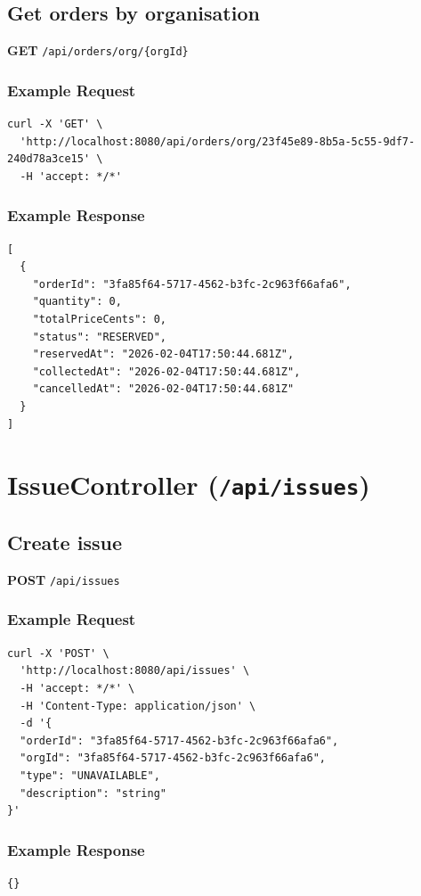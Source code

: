 \documentclass[a4paper,11pt]{article}
\begin{document}
\subsection{Get orders by organisation}
\textbf{GET} \texttt{/api/orders/org/\{orgId\}}
\subsubsection*{Example Request}
\begin{lstlisting}
curl -X 'GET' \
  'http://localhost:8080/api/orders/org/23f45e89-8b5a-5c55-9df7-240d78a3ce15' \
  -H 'accept: */*'
\end{lstlisting}

\subsubsection*{Example Response}
\begin{lstlisting}
[
  {
    "orderId": "3fa85f64-5717-4562-b3fc-2c963f66afa6",
    "quantity": 0,
    "totalPriceCents": 0,
    "status": "RESERVED",
    "reservedAt": "2026-02-04T17:50:44.681Z",
    "collectedAt": "2026-02-04T17:50:44.681Z",
    "cancelledAt": "2026-02-04T17:50:44.681Z"
  }
]
\end{lstlisting}

\section{IssueController (\texttt{/api/issues})}

\subsection{Create issue}
\textbf{POST} \texttt{/api/issues}
\subsubsection*{Example Request}
\begin{lstlisting}
curl -X 'POST' \
  'http://localhost:8080/api/issues' \
  -H 'accept: */*' \
  -H 'Content-Type: application/json' \
  -d '{
  "orderId": "3fa85f64-5717-4562-b3fc-2c963f66afa6",
  "orgId": "3fa85f64-5717-4562-b3fc-2c963f66afa6",
  "type": "UNAVAILABLE",
  "description": "string"
}'
\end{lstlisting}

\subsubsection*{Example Response}
\begin{lstlisting}
{}
\end{lstlisting}
\end{document}
